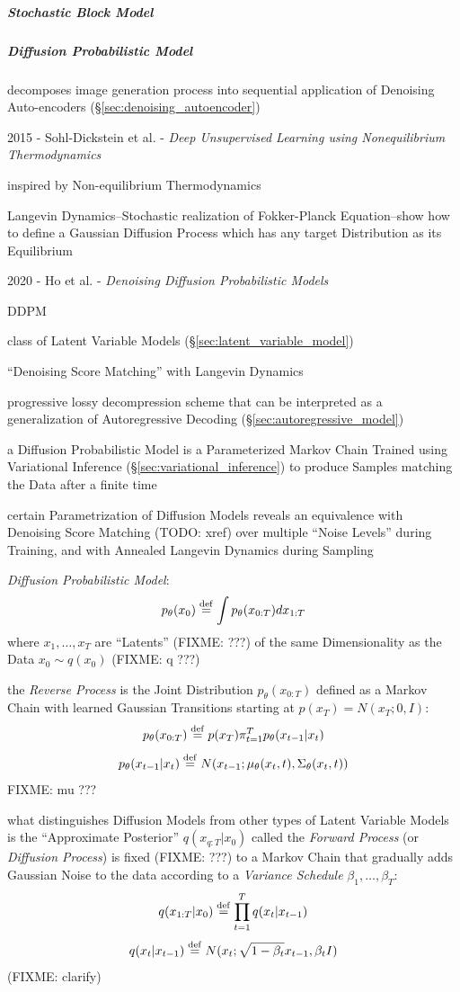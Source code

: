 \subparagraph{Stochastic Block Model}\label{sec:stochastic_block_model}\hfill

\subparagraph{Diffusion Probabilistic Model}
\label{sec:diffusion_probabilistic_model}\hfill

decomposes image generation process into sequential application of Denoising
Auto-encoders (\S\ref{sec:denoising_autoencoder})

2015 - Sohl-Dickstein et al. -
\emph{Deep Unsupervised Learning using Nonequilibrium Thermodynamics}

inspired by Non-equilibrium Thermodynamics

Langevin Dynamics--Stochastic realization of Fokker-Planck Equation--show how to
define a Gaussian Diffusion Process which has any target Distribution as its
Equilibrium

2020 - Ho et al. - \emph{Denoising Diffusion Probabilistic Models}

DDPM

class of Latent Variable Models (\S\ref{sec:latent_variable_model})

``Denoising Score Matching'' with Langevin Dynamics

progressive lossy decompression scheme that can be interpreted as a
generalization of Autoregressive Decoding (\S\ref{sec:autoregressive_model})

a Diffusion Probabilistic Model is a Parameterized Markov Chain Trained using
Variational Inference (\S\ref{sec:variational_inference}) to produce Samples
matching the Data after a finite time

certain Parametrization of Diffusion Models reveals an equivalence with
Denoising Score Matching (TODO: xref) over multiple ``Noise Levels'' during
Training, and with Annealed Langevin Dynamics during Sampling

\emph{Diffusion Probabilistic Model}:
\[
  p_\theta(x_0) \stackrel{\mathrm{def}}= \int p_\theta(x_{0:T}) dx_{1:T}
\]
where $x_1, \ldots, x_T$ are ``Latents'' (FIXME: ???) of the same Dimensionality
as the Data $x_0 \sim q(x_0)$ (FIXME: q ???)

the \emph{Reverse Process} is the Joint Distribution $p_\theta(x_{0:T})$ defined
as a Markov Chain with learned Gaussian Transitions starting at
$p(x_T) = N(x_T; 0, I)$:
\[
  p_\theta(x_{0:T}) \stackrel{\mathrm{def}}= p(x_T) \pi_{t=1}^T p_\theta(x_{t-1}|x_t)
\]
\[
  p_\theta(x_{t-1}|x_t)
    \stackrel{\mathrm{def}}= N(x_{t-1}; \mu_\theta(x_t, t), \Sigma_\theta(x_t, t))
\]
FIXME: mu ???

what distinguishes Diffusion Models from other types of Latent Variable Models
is the ``Approximate Posterior'' $q(x_{q:T}|x_0)$ called the \emph{Forward
Process} (or \emph{Diffusion Process}) is fixed (FIXME: ???) to a Markov Chain
that gradually adds Gaussian Noise to the data according to a \emph{Variance
Schedule} $\beta_1, \ldots, \beta_T$:
\[
  q(x_{1:T}|x_0) \stackrel{\mathrm{def}}= \prod_{t=1}^T q(x_t|x_{t-1})
\]
\[
  q(x_t|x_{t-1}) \stackrel{\mathrm{def}}= N(x_t; \sqrt{1-\beta_t} x_{t-1}, \beta_t I)
\]
(FIXME: clarify)

